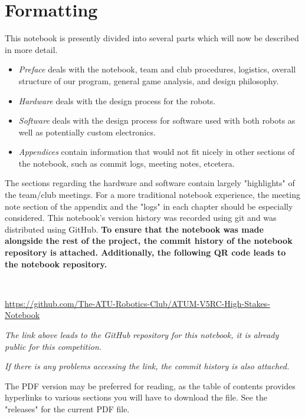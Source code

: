 \section{Formatting}
This notebook is presently divided into several parts which will now be
described in more detail.
\begin{itemize}
      \item \textit{Preface} deals with the notebook, team and club procedures,
            logistics, overall structure of our program, general game analysis,
            and design philosophy.
      \item \textit{Hardware} deals with the design process for the robots.
      \item \textit{Software} deals with the design process for software used
            with both robots as well as potentially custom electronics.
      \item \textit{Appendices} contain information that would not fit nicely in
            other sections of the notebook, such as commit logs, meeting notes,
            etcetera.
\end{itemize}
The sections regarding the hardware and software contain largely  "highlights"
of the team/club meetings. For a more traditional notebook experience, the
meeting note section of the appendix and the "logs" in each chapter should be
especially considered. This notebook's version history was recorded using git
and was distributed using GitHub. \textbf{To ensure that the notebook was made
      alongside the rest of the project, the commit history of the notebook repository
      is attached. Additionally, the following QR code leads to the notebook
      repository.}

\pagebreak
\begin{center}
      \
      \vfill

      \vspace*{40pt}
      \url{https://github.com/The-ATU-Robotics-Club/ATUM-V5RC-High-Stakes-Notebook}

      \textit{The link above leads to the GitHub repository for this notebook, it is already public for this competition.}

      \textit{If there is any problems accessing the link, the commit history is also attached.}

      The PDF version may be preferred for reading, as the table of contents
      provides hyperlinks to various sections you will have to download the
      file. See the "releases" for the current PDF file.
      \vfill
\end{center}
\pagebreak

